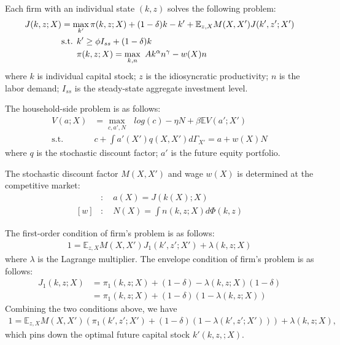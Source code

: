 Each firm with an individual state $(k,z)$ solves the following problem:
\begin{align*}
  J(k,z;X) &= \max_{k'} \pi(k,z;X) + (1-\delta)k -k' + \mathbb{E}_{z,X} M(X,X') J(k',z';X')
  \\
  &\text{s.t. } k' \geq \phi I_{ss} + (1-\delta)k 
  \\
  &\hphantom{\text{s.t. }} \pi(k,z;X) = \max_{k,n}\text{ } Ak^{\alpha}n^{\gamma} - w(X)n
\end{align*}
where $k$ is individual capital stock; $z$ is the idiosyncratic productivity; $n$ is the labor demand; $I_{ss}$ is the steady-state aggregate investment level.

The household-side problem is as follows:
\begin{align*}
  V(a;X) &= \max_{c,a',N}\text{ } log(c) - \eta N + \beta \mathbb{E}V(a';X')
  \\
  \text{s.t.}\quad& c + \int a'(X')q(X,X') d\Gamma_{X'} =  a + w(X)N
\end{align*}
where $q$ is the stochastic discount factor; $a'$ is the future equity portfolio.

The stochastic discount factor $M(X,X')$ and wage $w(X)$ is determined at the competitive market:
\begin{align*}
  [M]&:\quad a(X) = J(k(X);X)
  \\
  [w]&:\quad N(X) = \int n(k,z;X) d\Phi(k,z)
\end{align*}

The first-order condition of firm's problem is as follows:
\begin{align*}
  1 = \mathbb{E}_{z,X} M(X,X') J_{1}(k',z';X') + \lambda(k,z;X)
\end{align*}
where $\lambda$ is the Lagrange multiplier.
The envelope condition of firm's problem is as follows:
\begin{align*}
  J_{1}(k,z;X) 
  &= \pi_{1}(k,z;X) + (1-\delta) - \lambda(k,z;X)(1-\delta)
  \\
  &= \pi_{1}(k,z;X) + (1-\delta) (1 - \lambda(k,z;X))
\end{align*}
Combining the two conditions above, we have
\begin{align*}
  1 = \mathbb{E}_{z,X} M(X,X') (\pi_{1}(k',z';X') + (1-\delta) (1 - \lambda(k',z';X'))) + \lambda(k,z;X),
\end{align*}
which pins down the optimal future capital stock $k'(k,z,;X)$.
